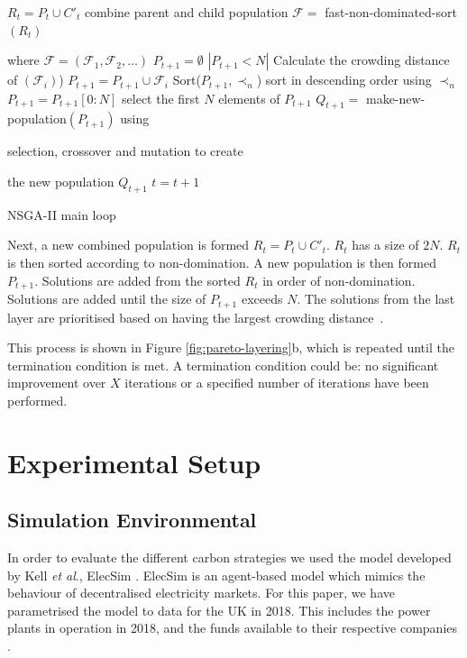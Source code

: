 \documentclass[sigconf]{acmart}
\begin{document}
\begin{algorithm}[b]
\begin{algorithmic}[1]
\State $R_t=P_t \cup C'_t$ combine parent and child population
\State $\mathcal{F} = $ fast-non-dominated-sort $(R_t)$ 

where $\mathcal{F}=(\mathcal{F}_1, \mathcal{F}_2,\ldots)$
\State $P_{t+1}=\emptyset$
\While $\left|P_{t+1}<N\right|$
\State Calculate the crowding distance of $(\mathcal{F}_i)$)
\State $P_{t+1}=P_{t+1}\cup \mathcal{F}_i$
\EndWhile
\State Sort($P_{t+1}, \prec_n$) sort in descending order using $\prec_n$
\State $P_{t+1} = P_{t+1}[0:N]$ select the first $N$ elements of $P_{t+1}$
\State $Q_{t+1} = $ make-new-population$(P_{t+1})$ using 

selection, crossover and mutation to create 

the new population $Q_{t+1}$
\State $t=t+1$
\caption{NSGA-II main loop \cite{Valkanas2014}}
\label{algo:nsga2}
\end{algorithmic}
\end{algorithm}


Next, a new combined population is formed $R_{t}=P_{t} \cup C'_{t}$. $R_t$ has a size of $2N$. $R_t$ is then sorted according to non-domination. A new population is then formed $P_{t+1}$. Solutions are added from the sorted $R_t$ in order of non-domination. Solutions are added until the size of $P_{t+1}$ exceeds $N$. The solutions from the last layer are prioritised based on having the largest crowding distance~\cite{Valkanas2014}.

This process is shown in Figure \ref{fig:pareto-layering}b, which is repeated until the termination condition is met. A termination condition could be:  no significant improvement over $X$ iterations or a specified number of iterations have been performed. 



\section{Experimental Setup}
\label{sec:sim_environment}


\subsection{Simulation Environmental}
In order to evaluate the different carbon strategies we used the model developed by Kell \textit{et al}., ElecSim \cite{Kell,Kell2020}. ElecSim is an agent-based model which mimics the behaviour of decentralised electricity markets. For this paper, we have parametrised the model to data for the UK in 2018. This includes the power plants in operation in 2018, and the funds available to their respective companies \cite{dukes_511, companies_house}.
\end{document}
